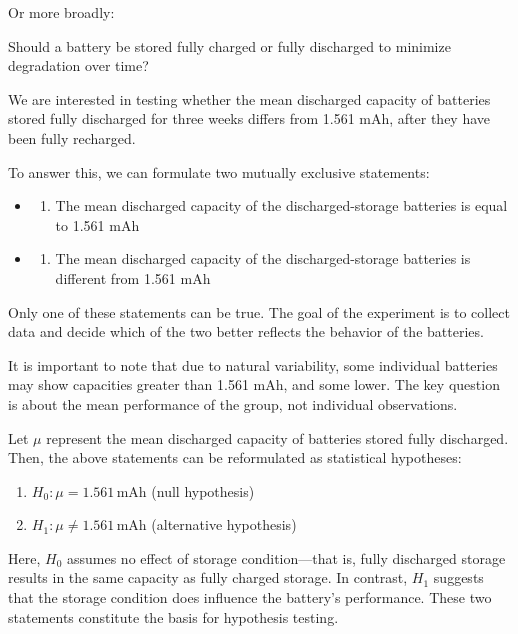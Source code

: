\documentclass[
]{book}
\providecommand{\tightlist}{%
  \setlength{\itemsep}{0pt}\setlength{\parskip}{0pt}}
\begin{document}
Or more broadly:

Should a battery be stored fully charged or fully discharged to minimize degradation over time?

We are interested in testing whether the mean discharged capacity of batteries stored fully discharged for three weeks differs from 1.561 mAh, after they have been fully recharged.

To answer this, we can formulate two mutually exclusive statements:

\begin{itemize}
\item
  \begin{enumerate}
  \def\labelenumi{\alph{enumi}.}
  \tightlist
  \item
    The mean discharged capacity of the discharged-storage batteries is equal to 1.561 mAh\\
  \end{enumerate}
\item
  \begin{enumerate}
  \def\labelenumi{\alph{enumi}.}
  \setcounter{enumi}{1}
  \tightlist
  \item
    The mean discharged capacity of the discharged-storage batteries is different from 1.561 mAh
  \end{enumerate}
\end{itemize}

Only one of these statements can be true. The goal of the experiment is to collect data and decide which of the two better reflects the behavior of the batteries.

It is important to note that due to natural variability, some individual batteries may show capacities greater than 1.561 mAh, and some lower. The key question is about the mean performance of the group, not individual observations.

Let \(\mu\) represent the mean discharged capacity of batteries stored fully discharged. Then, the above statements can be reformulated as statistical hypotheses:

\begin{enumerate}
\def\labelenumi{\alph{enumi}.}
\tightlist
\item
  \(H_0: \mu = 1.561\,\text{mAh}\) (null hypothesis)\\
\item
  \(H_1: \mu \neq 1.561\,\text{mAh}\) (alternative hypothesis)
\end{enumerate}

Here, \(H_0\) assumes no effect of storage condition---that is, fully discharged storage results in the same capacity as fully charged storage. In contrast, \(H_1\) suggests that the storage condition does influence the battery's performance. These two statements constitute the basis for hypothesis testing.
\end{document}
